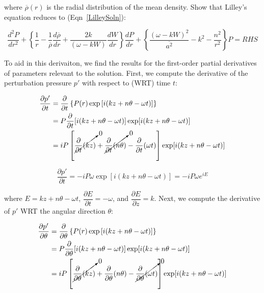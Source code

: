 \documentclass[]{aiaa-tc}%
\begin{document}
\noindent where $\overline{\rho}(r)$ is the radial distribution of the mean density.  Show that Lilley's equation reduces to (Eqn~\ref{LilleySoln}):

\begin{equation} \label{LilleySoln}
\dfrac{d^2 P}{dr^2}
+ \left\{ \dfrac{1}{r}
  - \dfrac{1}{\overline{\rho}} \dfrac{d\overline{\rho}}{dr}
  + \dfrac{2k}{(\omega - kW)} \dfrac{dW}{dr}
\right\} \dfrac{dP}{dr}
+ \left\{ \dfrac{(\omega - kW)^2}{\overline{a^2}} - k^2 - \dfrac{n^2}{r^2}
\right\} P = RHS
\end{equation}

To aid in this derivaiton, we find the results for the first-order partial derivatives of parameters relevant to the solution.  First, we compute the derivative of the perturbation pressure $p'$ with respect to (WRT) time $t$:

\newcommand\expterm{i(kz + n\theta -\omega t)}%

\begin{align*}
\dfrac{\partial p'}{\partial t} &= \dfrac{\partial}{\partial t}
  \left\{ P(r) \exp\left[ \expterm \right]\right\} \\
&= P \dfrac{\partial}{\partial t} [\expterm] \exp[\expterm] \\
&= iP \left[\cancelto{0}{\dfrac{\partial}{\partial t}(kz)      }
          + \cancelto{0}{\dfrac{\partial}{\partial t}(n\theta)}
                       - \dfrac{\partial}{\partial t}(\omega t)
    \right] \exp[\expterm] \\
\end{align*}

\begin{equation} \label{dpdt}
\boxed{\dfrac{\partial p'}{\partial t}
  = -iP\omega \exp[\expterm] = -iP\omega e^{iE} }
\end{equation}

\noindent where $E=kz + n\theta -\omega t$, $\dfrac{\partial E}{\partial t} = -\omega$, and $\dfrac{\partial E}{\partial z} = k$.  Next, we compute the derivative of $p'$ WRT the angular direction $\theta$:

\begin{align*}
\dfrac{\partial p'}{\partial \theta} &= \dfrac{\partial}{\partial \theta}
  \left\{ P(r) \exp\left[ \expterm \right]\right\} \\
&= P \dfrac{\partial}{\partial \theta} [\expterm] \exp[\expterm] \\
&= iP \left[\cancelto{0}{\dfrac{\partial}{\partial \theta}(kz)      }
                      + \dfrac{\partial}{\partial \theta}(n\theta)
          - \cancelto{0}{\dfrac{\partial}{\partial \theta}(\omega t)}
    \right] \exp[\expterm] \\
\end{align*}
\end{document}
